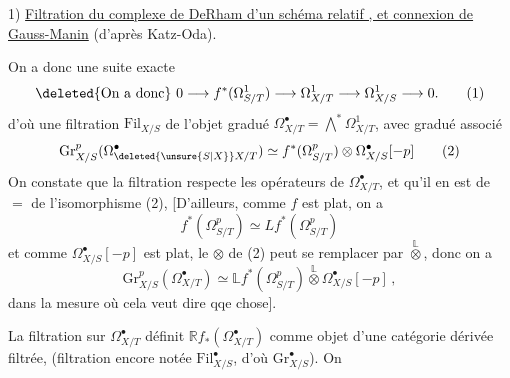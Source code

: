 1) \uline{Filtration du complexe de DeRham d'un schéma relatif , et connexion de Gauss-Manin}  (d'après Katz-Oda).


On a donc une suite exacte
\[
 \deleted{\text{On a donc}}\ 0\longrightarrow f^*(\Omega^1_{S/T})\longrightarrow\Omega^1_{X/T}\longrightarrow\Omega^1_{X/S}\longrightarrow0 . \tag*{(1)}
\]
d'où une filtration $\mathrm{Fil}_{X/S}$ de l'objet gradué $\Omega^\bullet_{X/T}=\bigwedge^{*}\Omega^1_{X/T}$, avec gradué associé
\[
 \mathrm{Gr}^p_{X/S}(\Omega^\bullet_{\deleted{\unsure{S|X}}X/T})\simeq f^*(\Omega^p_{S/T})\otimes\Omega^\bullet_{X/S}[-p] \tag*{(2)}
\]
On constate que la filtration respecte les opérateurs  de $\Omega^\bullet_{X/T}$, et qu'il en est de $=$ de l'isomorphisme (2),  [D'ailleurs, comme $f$ est plat, on a
\[
 f^*(\Omega^p_{S/T})\simeq Lf^*(\Omega^p_{S/T})
\]
et comme $\Omega^\bullet_{X/S}[-p]$ est plat, le $\otimes$ de (2) peut se remplacer par $\overset{\mathbb L}{\otimes}$, donc on a
\[
 \mathrm{Gr}^p_{X/S}(\Omega^\bullet_{X/T})\simeq\mathbb L f^*(\Omega^p_{S/T})\overset{\mathbb L}{\otimes}\Omega^\bullet_{X/S}[-p] \,, \tag*{(2$'$)}
\]
dans la mesure où cela veut dire qqe chose].

La filtration sur $\Omega^\bullet_{X/T}$ définit $\mathbb R f_*(\Omega^\bullet_{X/T})$ comme objet d'une catégorie dérivée filtrée, (filtration encore notée $\mathrm{Fil}^\bullet_{X/S}$, d'où $\mathrm{Gr}^\bullet_{X/S}$). On
